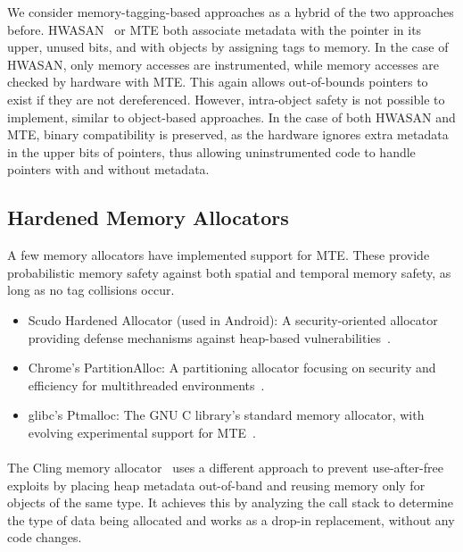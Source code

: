 We consider memory-tagging-based approaches as a hybrid of the two approaches before.
\Ac{HWASAN}~\cite{serebryany2018memory} or \ac{MTE} both associate metadata with the pointer in its upper, unused bits, and with objects by assigning tags to memory.
In the case of \ac{HWASAN}, only memory accesses are instrumented, while memory accesses are checked by hardware with \ac{MTE}.
This again allows out-of-bounds pointers to exist if they are not dereferenced.
However, intra-object safety is not possible to implement, similar to object-based approaches.
In the case of both \ac{HWASAN} and \ac{MTE}, binary compatibility is preserved, as the hardware ignores extra metadata in the upper bits of pointers, thus allowing uninstrumented code to handle pointers with and without metadata.

\subsection{Hardened Memory Allocators}
\label{subsec:hardened-memory-allocators}

A few memory allocators have implemented support for \ac{MTE}.
These provide probabilistic memory safety against both spatial and temporal memory safety, as long as no tag collisions occur.

\begin{itemize}
    \item Scudo Hardened Allocator (used in Android): A security-oriented allocator providing defense mechanisms against heap-based vulnerabilities~\cite{scudo_allocator}.
    \item Chrome's PartitionAlloc: A partitioning allocator focusing on security and efficiency for multithreaded environments~\cite{chrome_partition_alloc}.
    \item glibc's Ptmalloc: The GNU C library's standard memory allocator, with evolving experimental support for \ac{MTE}~\cite{glibc_ptmalloc}.
\end{itemize}

\paragraph{}
The Cling memory allocator~\cite{akritidis2010cling} uses a different approach to prevent use-after-free exploits by placing heap metadata out-of-band and reusing memory only for objects of the same type.
It achieves this by analyzing the call stack to determine the type of data being allocated and works as a drop-in replacement, without any code changes.
